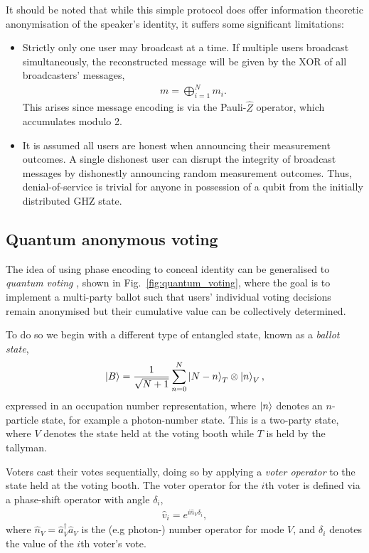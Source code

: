 It should be noted that while this simple protocol does offer information theoretic anonymisation of the speaker's identity, it suffers some significant limitations:
\begin{itemize}
\item Strictly only one user may broadcast at a time. If multiple users broadcast simultaneously, the reconstructed message will be given by the XOR of all broadcasters' messages,
	\begin{align}
		m = \bigoplus_{i=1}^{N} m_i.
	\end{align}
	This arises since message encoding is via the Pauli-$\hat{Z}$ operator, which accumulates modulo 2.
\item It is assumed all users are honest when announcing their measurement outcomes. A single dishonest user can disrupt the integrity of broadcast messages by dishonestly announcing random measurement outcomes. Thus, denial-of-service is trivial for anyone in possession of a qubit from the initially distributed GHZ state.
\end{itemize}

\subsection{Quantum anonymous voting}

The idea of using phase encoding to conceal identity can be generalised to \emph{quantum voting} \cite{bib:quantum_voting}, shown in Fig.~\ref{fig:quantum_voting}, where the goal is to implement a multi-party ballot such that users' individual voting decisions remain anonymised but their cumulative value can be collectively determined.

To do so we begin with a different type of entangled state, known as a \emph{ballot state},
\begin{align}
\ket{B} = \frac{1}{\sqrt{N+1}} \sum_{n=0}^N \ket{N-n}_T\otimes\ket{n}_V,
\end{align}
expressed in an occupation number representation, where $\ket{n}$ denotes an $n$-particle state, for example a photon-number state. This is a two-party state, where $V$ denotes the state held at the voting booth while $T$ is held by the tallyman.

Voters cast their votes sequentially, doing so by applying a \emph{voter operator} to the state held at the voting booth. The voter operator for the $i$th voter is defined via a phase-shift operator with angle $\delta_i$,
\begin{align}
\hat{v}_i = e^{i\hat{n}_V\delta_i},	
\end{align}
where $\hat{n}_V = \hat{a}^\dag_V\hat{a}_V$ is the (e.g photon-) number operator for mode $V$, and $\delta_i$ denotes the value of the $i$th voter's vote. 

